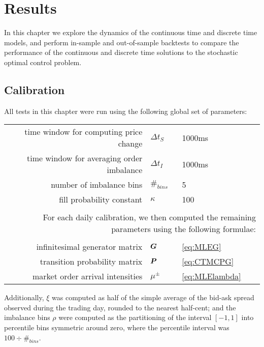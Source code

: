 %
%
%
%
\chapter{Results}

In this chapter we explore the dynamics of the continuous time and discrete time models, and perform in-sample and out-of-sample backtests to compare the performance of the continuous and discrete time solutions to the stochastic optimal control problem.

\section{Calibration}

All tests in this chapter were run using the following global set of parameters:
\begin{center}
\begin{tabular}{rll}
time window for computing price change & $\Delta t_S$ & 1000ms \\
time window for averaging order imbalance & $\Delta t_I$ & 1000ms \\
number of imbalance bins & $\#_{bins}$ & 5 \\
fill probability constant & $\kappa$ & 100 \\
&& \\
\multicolumn{3}{p{\linewidth}}{For each daily calibration, we then computed the remaining parameters using the following formulae:} \\
&& \\
infinitesimal generator matrix & $\boldsymbol{G}$ & \autoref{eq:MLEG} \\
transition probability matrix & $\boldsymbol{P}$ & \autoref{eq:CTMCPG} \\
market order arrival intensities & $\mu^\pm$ & \autoref{eq:MLElambda}
\end{tabular}
\end{center}

Additionally, $\xi$ was computed as half of the simple average of the bid-ask spread observed during the trading day, rounded to the nearest half-cent; and the imbalance bins $\rho$ were computed as the partitioning of the interval $[-1,1]$ into percentile bins symmetric around zero, where the percentile interval was $100 \div \#_{bins}$.

